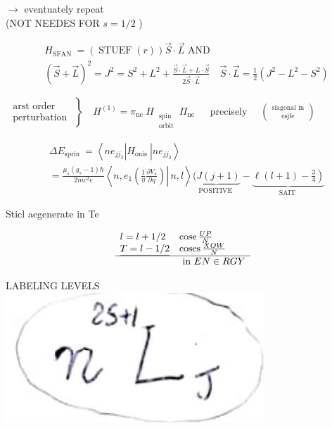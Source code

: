 \documentclass[10pt]{article}
\begin{document}
$\rightarrow$ eventuately repeat\\
(NOT NEEDES FOR $s=1 / 2$ )

$$
\begin{aligned}
& H_{\text {SFAN }}=(\operatorname{STUEF}(r)) \vec{S} \cdot \vec{L} \text { AND } \\
& (\vec{S}+\vec{L})^{2}=J^{2}=S^{2}+L^{2}+\frac{\vec{S} \cdot \vec{L}+L \cdot \vec{S}}{2 \vec{S} \cdot \vec{L}} \quad \vec{S} \cdot \vec{L}=\frac{1}{2}\left(J^{2}-L^{2}-S^{2}\right)
\end{aligned}
$$

$\left.\begin{array}{c}\text { arst order } \\ \text { perturbation }\end{array}\right\} \quad H^{(1)}=\pi_{\text {ne }} H_{\begin{array}{c}\text { spin } \\ \text { orbit }\end{array}} \Pi_{\text {ne }} \quad$ precisely $\quad\binom{\text { siagonal in }}{\text { esjfe }}$

$$
\begin{aligned}
& \Delta E_{\text {sprin }}=\left\langle n e_{j j_{2}}\right| H_{\text {onis }}\left|n e_{j j_{2}}\right\rangle \\
& =\frac{\mu_{s}\left(g_{s}-1\right) \hbar}{2 m c^{2} e}\left\langle n, \left.e_{1}\left(\frac{1}{\eta} \frac{\partial V_{s}}{\partial \eta}\right) \right\rvert\, n, l\right\rangle \underbrace{(J(j+1)}_{\text {POSITIVE }}-\underbrace{\left.\ell(l+1)-\frac{3}{4}\right)}_{\text {SAIT }}
\end{aligned}
$$

Sticl aegenerate in Te

$$
\begin{array}{ll}
l=l+1 / 2 & \operatorname{cose} \frac{U P}{N} \\
\underline{T=l-1 / 2} & \operatorname{coses} \frac{X O W}{N} \\
\hline & \text { in } E N \in R G Y
\end{array}
$$

LABELING LEVELS\\
\includegraphics[max width=\textwidth, center]{2025_10_16_e34e240cf6beac2f9e0dg-5(1)}
\end{document}
